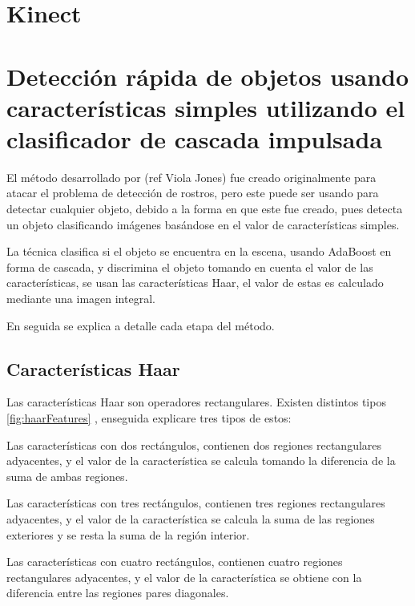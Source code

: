 \section{Kinect} 

\section{Detección rápida de objetos usando características simples utilizando el clasificador de cascada impulsada}\label{sec:ViolaJones}

El m\'etodo  desarrollado por (ref Viola Jones) fue creado originalmente para atacar el problema de detección de rostros, pero este puede ser usando para detectar cualquier objeto, debido a la forma en que este fue creado, pues detecta un objeto clasificando imágenes basándose en el valor de características simples.

La técnica clasifica si el objeto se encuentra en la escena, usando AdaBoost en forma de cascada, y discrimina el objeto tomando en cuenta el valor de las características, se usan las características Haar, el valor de estas es calculado mediante una imagen integral.

En seguida se explica a detalle cada etapa del método. 

\subsection{Características Haar}\label{subsec:CaracteristicasHaar}  

Las características Haar son operadores rectangulares. Existen distintos tipos \ref{fig:haarFeatures} , enseguida explicare tres tipos de estos:  

Las características con dos rectángulos, contienen dos regiones rectangulares adyacentes, y el valor de la característica se calcula tomando la diferencia de la suma de ambas regiones. 

Las características con tres rectángulos, contienen tres regiones rectangulares adyacentes, y el valor de la característica se calcula la suma de las regiones exteriores y se resta la suma de la región interior. 
 
Las características con cuatro rectángulos, contienen cuatro regiones rectangulares adyacentes, y el valor de la característica se obtiene con la diferencia entre las regiones pares diagonales.

